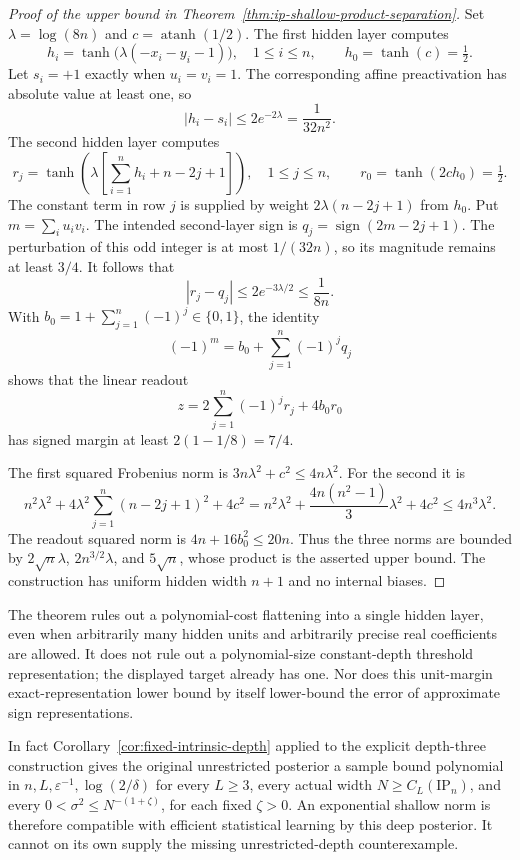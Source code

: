 \begin{proof}[Proof of the upper bound in
Theorem~\ref{thm:ip-shallow-product-separation}]
Set $\lambda=\log(8n)$ and $c=\operatorname{atanh}(1/2)$.
The first hidden layer computes
\[
 h_i=\tanh\bigl(\lambda(-x_i-y_i-1)\bigr),\quad 1\le i\le n,
 \qquad h_0=\tanh(c)=\tfrac12.
\]
Let $s_i=+1$ exactly when $u_i=v_i=1$. The corresponding affine
preactivation has absolute value at least one, so
\[
 |h_i-s_i|\le2e^{-2\lambda}=\frac1{32n^2}.
\]
The second hidden layer computes
\[
 r_j=\tanh\left(\lambda\left[\sum_{i=1}^n h_i+n-2j+1\right]\right),
 \quad 1\le j\le n,
 \qquad r_0=\tanh(2ch_0)=\tfrac12.
\]
The constant term in row $j$ is supplied by weight
$2\lambda(n-2j+1)$ from $h_0$. Put $m=\sum_i u_iv_i$. The intended
second-layer sign is $q_j=\operatorname{sign}(2m-2j+1)$.
The perturbation of this odd integer is at most $1/(32n)$, so
its magnitude remains at least $3/4$. It follows that
\[
 |r_j-q_j|\le2e^{-3\lambda/2}\le\frac1{8n}.
\]
With $b_0=1+\sum_{j=1}^n(-1)^j\in\{0,1\}$, the identity
\[
 (-1)^m=b_0+\sum_{j=1}^n(-1)^jq_j
\]
shows that the linear readout
\[
 z=2\sum_{j=1}^n(-1)^jr_j+4b_0r_0
\]
has signed margin at least $2(1-1/8)=7/4$.

The first squared Frobenius norm is $3n\lambda^2+c^2\le4n\lambda^2$.
For the second it is
\[
 n^2\lambda^2+4\lambda^2\sum_{j=1}^n(n-2j+1)^2+4c^2
 =n^2\lambda^2+\frac{4n(n^2-1)}3\lambda^2+4c^2
 \le4n^3\lambda^2.
\]
The readout squared norm is $4n+16b_0^2\le20n$. Thus the three
norms are bounded by $2\sqrt n\lambda$, $2n^{3/2}\lambda$, and
$5\sqrt n$, whose product is the asserted upper bound. The
construction has uniform hidden width $n+1$ and no internal biases.
\end{proof}

The theorem rules out a polynomial-cost flattening into a single hidden
layer, even when arbitrarily many hidden units and arbitrarily precise
real coefficients are allowed. It does not rule out a polynomial-size
constant-depth threshold representation; the displayed target already
has one. Nor does this unit-margin exact-representation lower bound by
itself lower-bound the error of approximate sign representations.

In fact Corollary~\ref{cor:fixed-intrinsic-depth} applied to the explicit
depth-three construction gives the original unrestricted posterior a
sample bound polynomial in $n,L,\varepsilon^{-1},\log(2/\delta)$ for
every $L\ge3$, every actual width $N\ge C_L(\mathrm{IP}_n)$, and every
$0<\sigma^2\le N^{-(1+\zeta)}$, for each fixed $\zeta>0$.
An exponential shallow norm is therefore compatible with efficient
statistical learning by this deep posterior. It cannot on its own
supply the missing unrestricted-depth counterexample.
